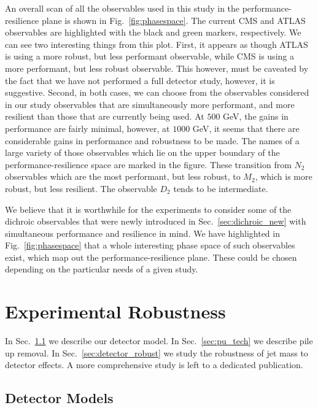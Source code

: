 \documentclass[11pt,letterpaper]{article}
\DeclareRobustCommand{\Sec}[1]{Sec.~\ref{#1}}
\DeclareRobustCommand{\Fig}[1]{Fig.~\ref{#1}}
\begin{document}
An overall scan of all the observables used in this study in the performance-resilience plane is shown in \Fig{fig:phasespace}. The current CMS and ATLAS observables are highlighted with the black and green markers, respectively. We can see two interesting things from this plot. First, it appears as though ATLAS is using a more robust, but less performant observable, while CMS is using a more performant, but less robust observable. This however, must be caveated by the fact that we have not performed a full detector study, however, it is suggestive. Second, in both cases, we can choose from the observables considered in our study observables that are simultaneously more performant, and more resilient than those that are currently being used. At $500$ GeV, the gains in performance are fairly minimal, however, at $1000$ GeV, it seems that there are considerable gains in performance and robustness to be made.
The names of a large variety of those observables which lie on the upper boundary of the performance-resilience space are marked in the figure. These transition from $N_2$ observables which are the most performant, but less robust, to $M_2$, which is more robust, but less resilient. The observable $D_2$ tends to be intermediate.

We believe that it is worthwhile for the experiments to consider some of the  dichroic observables that were newly introduced in \Sec{sec:dichroic_new} with simultaneous performance and resilience in mind. We have highlighted in \Fig{fig:phasespace} that a whole interesting phase space of such observables exist, which map out the performance-resilience plane. These could be chosen depending on the particular needs of a given study.








\section{Experimental Robustness}\label{sec:exp}


In \Sec{sec:det_model} we describe our detector model. In \Sec{sec:pu_tech} we describe pile up removal. In \Sec{sec:detector_robust} we study the robustness of jet mass to detector effects. A more comprehensive study is left to a dedicated publication.

\subsection{Detector Models}\label{sec:det_model}
\end{document}

